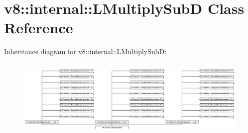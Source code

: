 \hypertarget{classv8_1_1internal_1_1_l_multiply_sub_d}{}\section{v8\+:\+:internal\+:\+:L\+Multiply\+SubD Class Reference}
\label{classv8_1_1internal_1_1_l_multiply_sub_d}
Inheritance diagram for v8\+:\+:internal\+:\+:L\+Multiply\+SubD\+:\begin{figure}[H]
\begin{center}
\leavevmode
\includegraphics[height=3.816605cm]{classv8_1_1internal_1_1_l_multiply_sub_d}
\end{center}
\end{figure}
